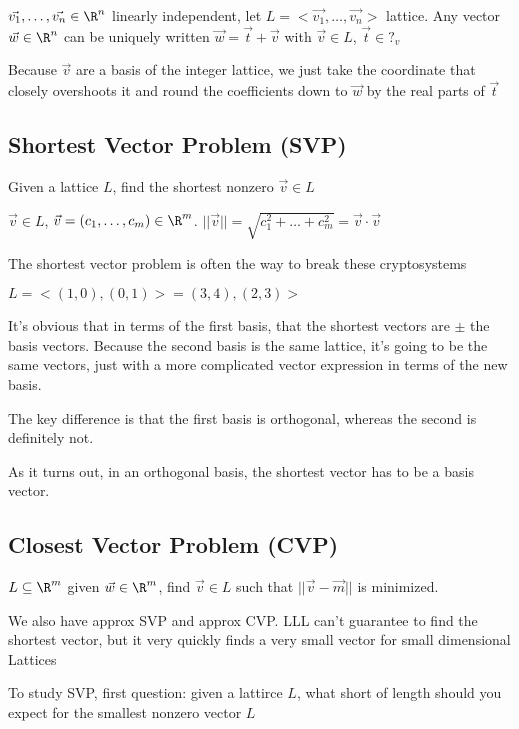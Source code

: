 \documentclass[10pt]{article}
\begin{document}
\begin{lem}
    $\vec{v_1}, \ldots, \vec{v_n} \in \R^n$ linearly independent, let $L = <\vec{v_1}, \ldots, \vec{v_n}>$ lattice. Any vector $\vec{w} \in \R^n$ can be uniquely written $\vec{w} = \vec{t} + \vec{v}$ with $\vec{v} \in L$, $\vec{t} \in ?_v$
\end{lem}
Because $\vec{v}$ are a basis of the integer lattice, we just take the coordinate that closely overshoots it and round the coefficients down to $\vec{w}$ by the real parts of $\vec{t}$

\subsection{Shortest Vector Problem (SVP)}
Given a lattice $L$, find the shortest nonzero $\vec{v}\in L$

$\vec{v} \in L$, $\vec{v} = (c_1, \ldots, c_m) \in \R^m$. $|| \vec{v}|| = \sqrt{c_1^2 + \ldots + c_m^2} = \vec{v}\cdot \vec{v}$

\begin{rmk}
    The shortest vector problem is often the way to break these cryptosystems
\end{rmk}

\begin{exm}
    $L = <(1, 0), (0, 1)> = (3, 4), (2, 3)>$
\end{exm}
It's obvious that in terms of the first basis, that the shortest vectors are $\pm$ the basis vectors. Because the second basis is the same lattice, it's going to be the same vectors, just with a more complicated vector expression in terms of the new basis.

The key difference is that the first basis is orthogonal, whereas the second is definitely not.

As it turns out, in an orthogonal basis, the shortest vector has to be a basis vector.

\subsection{Closest Vector Problem (CVP)} $L \subseteq \R^m$ given $\vec{w} \in \R^m$, find $\vec{v} \in L$ such that $||\vec{v} - \vec{m}||$ is minimized.

We also have approx SVP and approx CVP. LLL can't guarantee to find the shortest vector, but it very quickly finds a very small vector for small dimensional Lattices

To study SVP, first question: given a lattirce $L$, what short of length should you expect for the smallest nonzero vector $L$
\end{document}
